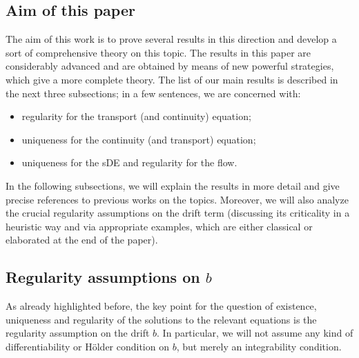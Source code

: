 \documentclass[a4paper,10pt]{article}
\begin{document}
\subsection{Aim of this paper}

The aim of this work is to prove several results in this direction and
develop a sort of comprehensive theory on this topic. The results in this paper are considerably advanced and are
obtained by means of new powerful strategies, which give a more complete
theory. The list of our main results is described in the next three
subsections; in a few sentences, we are concerned with:
\begin{itemize}
\item[i)] regularity for the transport (and continuity) equation;
\item[ii)] uniqueness for the continuity (and transport) equation;
\item[iii)] uniqueness for the sDE and regularity for the flow.
\end{itemize}

In the following subsections, we will explain the results in more detail and give precise references to previous works on the topics. Moreover, we will also analyze the crucial regularity assumptions on the drift term (discussing its criticality in a heuristic way and via appropriate examples, which are either classical or elaborated at the end of the paper).

\subsection{Regularity assumptions on $b$}

As already highlighted before, the key point for the question of existence, uniqueness and regularity of the solutions to the relevant equations is the regularity assumption on
the drift $b$. In particular, we will not assume any kind of
differentiability or H\"{o}lder condition on $b$, but merely an
integrability condition.
 
\end{document}
